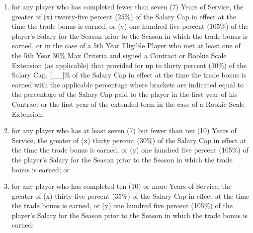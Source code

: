 \documentclass[
]{book}
\providecommand{\tightlist}{%
  \setlength{\itemsep}{0pt}\setlength{\parskip}{0pt}}
\begin{document}
\begin{enumerate}
  \begin{enumerate}
  \def\labelenumii{(\roman{enumii})}
  \tightlist
  \item
    for any player who has completed fewer than seven (7) Years of Service, the greater of (x) twenty-five percent (25\%) of the Salary Cap in effect at the time the trade bonus is earned, or (y) one hundred five percent (105\%) of the player's Salary for the Season prior to the Season in which the trade bonus is earned, or in the case of a 5th Year Eligible Player who met at least one of the 5th Year 30\% Max Criteria and signed a Contract or Rookie Scale Extension (as applicable) that provided for up to thirty percent (30\%) of the Salary Cap, {[}\_\_{]}\% of the Salary Cap in effect at the time the trade bonus is earned with the applicable percentage where brackets are indicated equal to the percentage of the Salary Cap paid to the player in the first year of his Contract or the first year of the extended term in the case of a Rookie Scale Extension;
  \item
    for any player who has at least seven (7) but fewer than ten (10) Years of Service, the greater of (x) thirty percent (30\%) of the Salary Cap in effect at the time the trade bonus is earned, or (y) one hundred five percent (105\%) of the player's Salary for the Season prior to the Season in which the trade bonus is earned; or
  \item
    for any player who has completed ten (10) or more Years of Service, the greater of (x) thirty-five percent (35\%) of the Salary Cap in effect at the time the trade bonus is earned, or (y) one hundred five percent (105\%) of the player's Salary for the Season prior to the Season in which the trade bonus is earned;
  \end{enumerate}


\end{enumerate}
\end{document}
